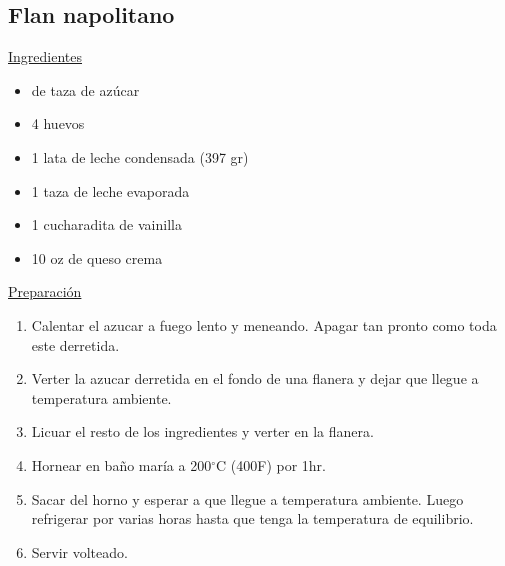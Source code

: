 \subsection{Flan napolitano}
\underline{Ingredientes}
\begin{itemize}
\item {} de taza de az\'ucar
\item 4 huevos
\item 1 lata de leche condensada (397 gr)
\item 1 taza de leche evaporada
\item 1 cucharadita de vainilla
\item 10 oz de queso crema
\end{itemize}

\underline{Preparaci\'on}
\begin{enumerate}
\item Calentar el azucar a fuego lento y meneando. Apagar tan pronto como toda este derretida.
\item Verter la azucar derretida en el fondo de una flanera y dejar que llegue a temperatura ambiente.
\item Licuar el resto de los ingredientes y verter en la flanera.
\item Hornear en baño mar\'ia a 200$^\circ$C (400F) por 1hr.
\item Sacar del horno y esperar a que llegue a temperatura ambiente. Luego refrigerar por varias horas hasta que tenga la temperatura de equilibrio.
\item Servir volteado.
\end{enumerate}
